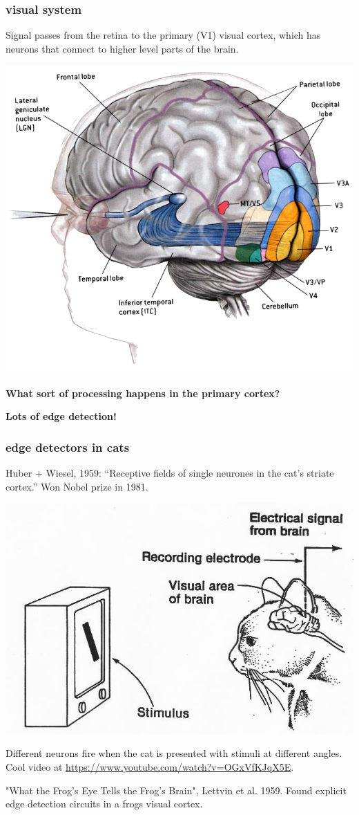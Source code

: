 \documentclass[handout,compress]{beamer}
\begin{document}
	\begin{frame}
	\frametitle{visual system}
	\small
	Signal passes from the retina to the primary (V1) visual cortex, which has neurons that connect to higher level parts of the brain.
	\begin{center}
			\includegraphics[width=.5\textwidth]{cortex.png}
			
			\textbf{What sort of processing happens in the primary cortex?} 
				
				\textbf{\alert{Lots of edge detection!}}
	\end{center}

	
	\end{frame}

	\begin{frame}
	\frametitle{edge detectors in cats}
	\small
	Huber + Wiesel, 1959: ``Receptive fields of single neurones in the cat's striate cortex.'' Won Nobel prize in 1981.
	\vspace{-.5em}
		\begin{center}
		\includegraphics[width=.5\textwidth]{cat_experiment.jpg}
	\end{center}
	Different neurons fire when the cat is presented with stimuli at different angles. Cool video at \url{https://www.youtube.com/watch?v=OGxVfKJqX5E}.
	
	"What the Frog's Eye Tells the Frog's Brain", Lettvin et al. 1959. Found explicit edge detection circuits in a frogs visual cortex.
	\end{frame}
\end{document}
